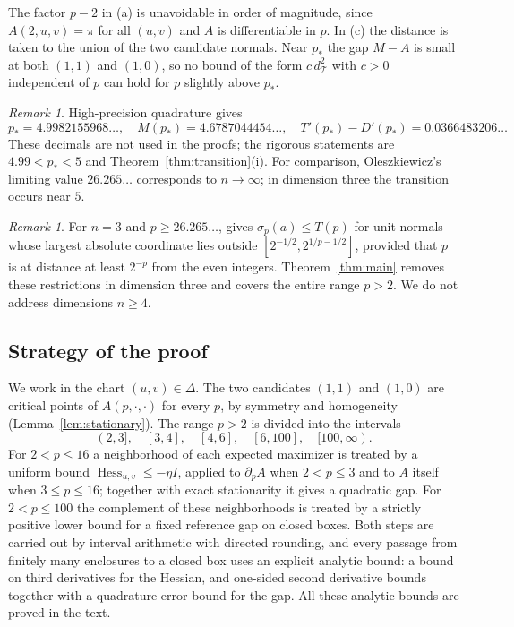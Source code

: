 \documentclass[11pt]{amsart}
\theoremstyle{definition}
\theoremstyle{remark}
\newtheorem{remark}[theorem]{Remark}
\numberwithin{equation}{section}
\newcommand{\Hess}{\operatorname{Hess}}
\newcommand{\cT}{\mathcal{T}}
\begin{document}
The factor $p-2$ in (a) is unavoidable in order of magnitude, since $A(2,u,v)=\pi$ for all $(u,v)$ and $A$ is differentiable in $p$. In (c) the distance is taken to the union of the two candidate normals. Near $p_*$ the gap $M-A$ is small at both $(1,1)$ and $(1,0)$, so no bound of the form $c\,d_\cT^2$ with $c>0$ independent of $p$ can hold for $p$ slightly above $p_*$.

\begin{remark}\label{rem:numerics}
High-precision quadrature gives
\[
p_*=4.9982155968\ldots,\quad M(p_*)=4.6787044454\ldots,\quad T'(p_*)-D'(p_*)=0.0366483206\ldots
\]
These decimals are not used in the proofs; the rigorous statements are $4.99<p_*<5$ and Theorem~\ref{thm:transition}(i). For comparison, Oleszkiewicz's limiting value $26.265\ldots$ corresponds to $n\to\infty$; in dimension three the transition occurs near $5$.
\end{remark}

\begin{remark}
For $n=3$ and $p\ge 26.265\ldots$, \cite[Theorem~1.1]{Koe} gives $\sigma_p(a)\le T(p)$ for unit normals whose largest absolute coordinate lies outside $[2^{-1/2},2^{1/p-1/2}]$, provided that $p$ is at distance at least $2^{-p}$ from the even integers. Theorem~\ref{thm:main} removes these restrictions in dimension three and covers the entire range $p>2$. We do not address dimensions $n\ge 4$.
\end{remark}

\subsection{Strategy of the proof}
We work in the chart $(u,v)\in\Delta$. The two candidates $(1,1)$ and $(1,0)$ are critical points of $A(p,\cdot,\cdot)$ for every $p$, by symmetry and homogeneity (Lemma~\ref{lem:stationary}). The range $p>2$ is divided into the intervals
\[
(2,3],\quad [3,4],\quad [4,6],\quad [6,100],\quad [100,\infty).
\]
For $2<p\le16$ a neighborhood of each expected maximizer is treated by a uniform bound $\Hess_{u,v}\le -\eta I$, applied to $\partial_pA$ when $2<p\le3$ and to $A$ itself when $3\le p\le16$; together with exact stationarity it gives a quadratic gap. For $2<p\le100$ the complement of these neighborhoods is treated by a strictly positive lower bound for a fixed reference gap on closed boxes. Both steps are carried out by interval arithmetic with directed rounding, and every passage from finitely many enclosures to a closed box uses an explicit analytic bound: a bound on third derivatives for the Hessian, and one-sided second derivative bounds together with a quadrature error bound for the gap. All these analytic bounds are proved in the text.
\end{document}
